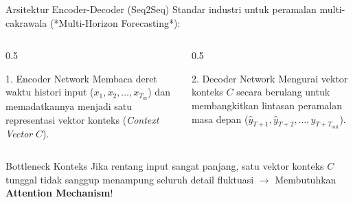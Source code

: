 \documentclass[aspectratio=169, 10pt]{beamer}
\begin{document}
\begin{frame}{Arsitektur Encoder-Decoder (Seq2Seq)}
    Standar industri untuk peramalan multi-cakrawala (*Multi-Horizon Forecasting*):
    \begin{columns}[T]
        \begin{column}{0.5\textwidth}
            \begin{block}{1. Encoder Network}
                Membaca deret waktu histori input ($x_1, x_2, \dots, x_{T_{\text{in}}}$) dan memadatkannya menjadi satu representasi vektor konteks (\textit{Context Vector} $C$).
            \end{block}
        \end{column}
        \begin{column}{0.5\textwidth}
            \begin{block}{2. Decoder Network}
                Mengurai vektor konteks $C$ secara berulang untuk membangkitkan lintasan peramalan masa depan ($\hat{y}_{T+1}, \hat{y}_{T+2}, \dots, \hat{y}_{T+T_{\text{out}}}$).
            \end{block}
        \end{column}
    \end{columns}
    \vspace{0.2cm}
    \begin{alertblock}{Bottleneck Konteks}
        Jika rentang input sangat panjang, satu vektor konteks $C$ tunggal tidak sanggup menampung seluruh detail fluktuasi $\to$ Membutuhkan \textbf{Attention Mechanism}!
    \end{alertblock}
\end{frame}
\end{document}

